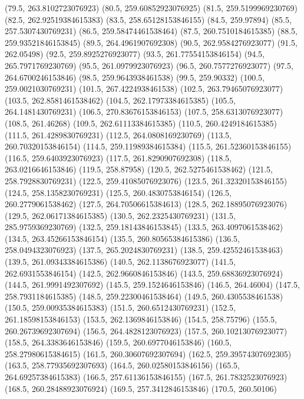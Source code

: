 {{{		(79.5, 263.8102723076923)
		(80.5, 259.60852923076925)
		(81.5, 259.5199969230769)
		(82.5, 262.92519384615383)
		(83.5, 258.65128153846155)
		(84.5, 259.97894)
		(85.5, 257.5307430769231)
		(86.5, 259.58474461538464)
		(87.5, 260.7510184615385)
		(88.5, 259.93521846153845)
		(89.5, 264.4961907692308)
		(90.5, 262.9584276923077)
		(91.5, 262.05498)
		(92.5, 259.8925276923077)
		(93.5, 261.77554153846154)
		(94.5, 265.7971769230769)
		(95.5, 261.0979923076923)
		(96.5, 260.7577276923077)
		(97.5, 264.6700246153846)
		(98.5, 259.9643938461538)
		(99.5, 259.90332)
		(100.5, 259.0021030769231)
		(101.5, 267.4224938461538)
		(102.5, 263.79465076923077)
		(103.5, 262.8581461538462)
		(104.5, 262.17973384615385)
		(105.5, 264.1481430769231)
		(106.5, 270.83676153846153)
		(107.5, 258.6313076923077)
		(108.5, 261.46268)
		(109.5, 262.61113384615385)
		(110.5, 260.4249184615385)
		(111.5, 261.4289830769231)
		(112.5, 264.0808169230769)
		(113.5, 260.70320153846154)
		(114.5, 259.11989384615384)
		(115.5, 261.52360153846155)
		(116.5, 259.6403923076923)
		(117.5, 261.8290907692308)
		(118.5, 263.0216646153846)
		(119.5, 258.87958)
		(120.5, 262.5275461538462)
		(121.5, 258.7928830769231)
		(122.5, 259.41085076923076)
		(123.5, 261.32320153846155)
		(124.5, 258.1358230769231)
		(125.5, 260.4830753846154)
		(126.5, 260.2779061538462)
		(127.5, 264.70506615384613)
		(128.5, 262.18895076923076)
		(129.5, 262.06171384615385)
		(130.5, 262.2325430769231)
		(131.5, 285.9759369230769)
		(132.5, 259.18143846153845)
		(133.5, 263.4097061538462)
		(134.5, 263.45266153846154)
		(135.5, 260.80565384615386)
		(136.5, 258.0494323076923)
		(137.5, 265.2024830769231)
		(138.5, 259.42552461538463)
		(139.5, 261.09343384615386)
		(140.5, 262.1138676923077)
		(141.5, 262.6931553846154)
		(142.5, 262.9660846153846)
		(143.5, 259.68836923076924)
		(144.5, 261.9991492307692)
		(145.5, 259.1524646153846)
		(146.5, 264.46004)
		(147.5, 258.7931184615385)
		(148.5, 259.22300461538464)
		(149.5, 260.4305538461538)
		(150.5, 259.00935384615383)
		(151.5, 260.6512430769231)
		(152.5, 261.18598153846153)
		(153.5, 262.1369846153846)
		(154.5, 258.75796)
		(155.5, 260.26739692307694)
		(156.5, 264.4828123076923)
		(157.5, 260.10213076923077)
		(158.5, 264.3383646153846)
		(159.5, 260.6977046153846)
		(160.5, 258.27980615384615)
		(161.5, 260.30607692307694)
		(162.5, 259.39574307692305)
		(163.5, 258.77935692307693)
		(164.5, 260.02580153846156)
		(165.5, 264.69257384615383)
		(166.5, 257.61136153846155)
		(167.5, 261.7832523076923)
		(168.5, 260.28488923076924)
		(169.5, 257.3412846153846)
		(170.5, 260.50106)
}}}
